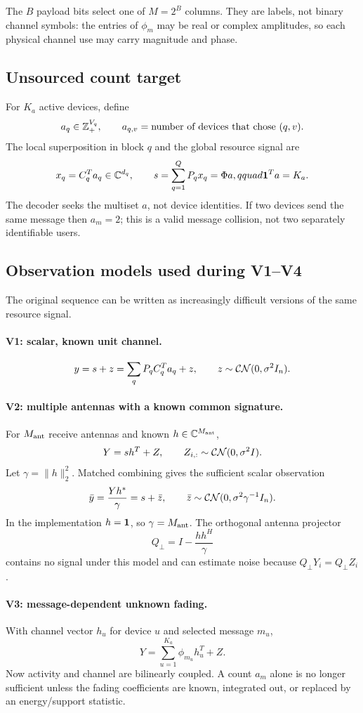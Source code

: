 \documentclass[11pt]{article}
\begin{document}
The $B$ payload bits select one of $M=2^B$ columns. They are labels, not binary channel symbols: the entries of
$\phi_m$ may be real or complex amplitudes, so each physical channel use may carry magnitude and phase.

\subsection{Unsourced count target}

For $K_a$ active devices, define
\[
 a_q\in\mathbb{Z}_+^{V_q},\qquad a_{q,v}=\text{number of devices that chose }(q,v).
\]
The local superposition in block $q$ and the global resource signal are
\[
 x_q=C_q^Ta_q\in\mathbb{C}^{d_q},\qquad
 s=\sum_{q=1}^QP_qx_q=\Phi a,qquad \mathbf{1}^Ta=K_a.
\]
The decoder seeks the multiset $a$, not device identities. If two devices send the same message then $a_m=2$; this is
a valid message collision, not two separately identifiable users.

\subsection{Observation models used during V1--V4}

The original sequence can be written as increasingly difficult versions of the same resource signal.

\paragraph{V1: scalar, known unit channel.}
\[
 y=s+z=\sum_qP_qC_q^Ta_q+z,
 \qquad z\sim\mathcal{CN}(0,\sigma^2I_n).
\]

\paragraph{V2: multiple antennas with a known common signature.}
For $M_{\rm ant}$ receive antennas and known $h\in\mathbb{C}^{M_{\rm ant}}$,
\[
 Y=sh^T+Z,
 \qquad Z_{i,:}\sim\mathcal{CN}(0,\sigma^2I).
\]
Let $\gamma=\|h\|_2^2$. Matched combining gives the sufficient scalar observation
\[
 \bar y=\frac{Yh^*}{\gamma}=s+\bar z,
 \qquad \bar z\sim\mathcal{CN}(0,\sigma^2\gamma^{-1}I_n).
\]
In the implementation $h=\mathbf{1}$, so $\gamma=M_{\rm ant}$. The orthogonal antenna projector
\[
 Q_\perp=I-\frac{hh^H}{\gamma}
\]
contains no signal under this model and can estimate noise because $Q_\perp Y_i=Q_\perp Z_i$.

\paragraph{V3: message-dependent unknown fading.}
With channel vector $h_u$ for device $u$ and selected message $m_u$,
\[
 Y=\sum_{u=1}^{K_a}\phi_{m_u}h_u^T+Z.
\]
Now activity and channel are bilinearly coupled. A count $a_m$ alone is no longer sufficient unless the fading
coefficients are known, integrated out, or replaced by an energy/support statistic.
\end{document}
